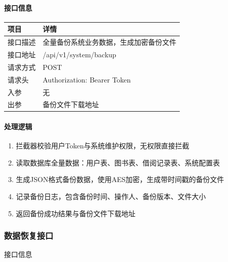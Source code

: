 \documentclass[12pt, a4paper]{article}
\begin{document}
\paragraph{接口信息}

\begin{table}[H]
    \centering
    \begin{tabular}{|l|l|}
        \hline
        项目 & 详情 \\
        \hline
        接口描述 & 全量备份系统业务数据，生成加密备份文件 \\
        \hline
        接口地址 & /api/v1/system/backup \\
        \hline
        请求方式 & POST \\
        \hline
        请求头 & Authorization: Bearer {Token} \\
        \hline
        入参 & 无 \\
        \hline
        出参 & 备份文件下载地址 \\
        \hline
    \end{tabular}
\end{table}

\paragraph{处理逻辑}
\begin{enumerate}
\item 拦截器校验用户Token与系统维护权限，无权限直接拦截

\item 读取数据库全量数据：用户表、图书表、借阅记录表、系统配置表

\item 生成JSON格式备份数据，使用AES加密，生成带时间戳的备份文件

\item 记录备份日志，包含备份时间、操作人、备份版本、文件大小

\item 返回备份成功结果与备份文件下载地址
\end{enumerate}

\subsubsection{数据恢复接口}

\begin{center}
    接口信息
\end{center}
\end{document}
